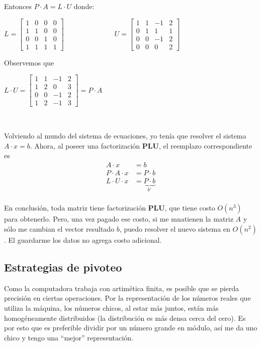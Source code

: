 \documentclass[]{article}
\begin{document}
Entonces $P\cdot A = L\cdot U$ donde:
\begin{center}
	$L = \begin{bmatrix}
		1&0&0&0\\
		1&1&0&0\\
		0&0&1&0\\
		1&1&1&1
	\end{bmatrix}\hspace{3cm} U = \begin{bmatrix}
		1&1&-1&2\\
		0&1&1&1\\
		0&0&-1&2\\
		0&0&0&2
	\end{bmatrix}$
\end{center}

Observemos que
\begin{center}
	$L\cdot U = \begin{bmatrix}
		1&1&-1&2\\
		1&2&0&3\\
		0&0&-1&2\\
		1&2&-1&3
	\end{bmatrix} = P\cdot A$
\end{center}


~\newline

Volviendo al mundo del sistema de ecuaciones, yo tenía que resolver el sistema $A\cdot x = b$. Ahora, al poseer una factorización \textbf{PLU}, el reemplazo correspondiente es
\begin{align*}
	A\cdot x &= b\\
	P\cdot A \cdot x &= P\cdot b\\
	L\cdot U \cdot x &= \underbrace{P\cdot b}_{b'}\\
\end{align*}

En conclusión, toda matriz tiene factorización \textbf{PLU}, que tiene costo $O(n^3)$ para obtenerlo. Pero, una vez pagado ese costo, si me mnatienen la matriz $A$ y sólo me cambian el vector resultado $b$, puedo resolver el nuevo sistema en $O(n^2)$. El guardarme los datos no agrega costo adicional.

\subsection{Estrategias de pivoteo}
Como la computadora trabaja con artimética finita, es posible que se pierda precisión en ciertas operaciones. Por la representación de los números reales que utiliza la máquina, los números chicos, al estar más juntos, están más homogéneamente distribuidos (la distribución es más densa cerca del cero). Es por esto que es preferible dividir por un número grande en módulo, así me da uno chico y tengo una ``mejor'' representación.
\end{document}
